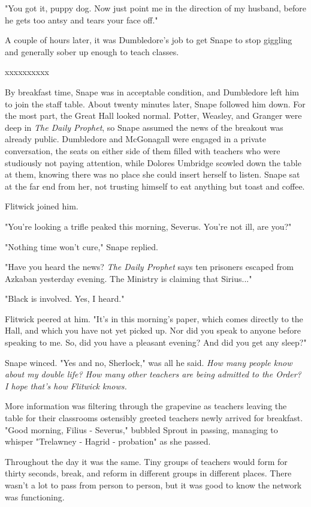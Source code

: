 \documentclass[a4paper,11pt]{article}
\begin{document}
"You got it, puppy dog. Now just point me in the direction of my husband, before he gets too antsy and tears your face off."

A couple of hours later, it was Dumbledore's job to get Snape to stop giggling and generally sober up enough to teach classes.

xxxxxxxxxx

By breakfast time, Snape was in acceptable condition, and Dumbledore left him to join the staff table. About twenty minutes later, Snape followed him down. For the most part, the Great Hall looked normal. Potter, Weasley, and Granger were deep in \emph{The Daily Prophet}, so Snape assumed the news of the breakout was already public. Dumbledore and McGonagall were engaged in a private conversation, the seats on either side of them filled with teachers who were studiously not paying attention, while Dolores Umbridge scowled down the table at them, knowing there was no place she could insert herself to listen. Snape sat at the far end from her, not trusting himself to eat anything but toast and coffee.

Flitwick joined him.

"You're looking a trifle peaked this morning, Severus. You're not ill, are you?"

"Nothing time won't cure," Snape replied.

"Have you heard the news? \emph{The Daily Prophet} says ten prisoners escaped from Azkaban yesterday evening. The Ministry is claiming that Sirius..."

"Black is involved. Yes, I heard."

Flitwick peered at him. "It's in this morning's paper, which comes directly to the Hall, and which you have not yet picked up. Nor did you speak to anyone before speaking to me. So, did you have a pleasant evening? And did you get any sleep?"

Snape winced. "Yes and no, Sherlock," was all he said. \emph{How many people know about my double life? How many other teachers are being admitted to the Order? I hope that's how Flitwick knows.}

More information was filtering through the grapevine as teachers leaving the table for their classrooms ostensibly greeted teachers newly arrived for breakfast. "Good morning, Filius - Severus," bubbled Sprout in passing, managing to whisper "Trelawney - Hagrid - probation" as she passed.

Throughout the day it was the same. Tiny groups of teachers would form for thirty seconds, break, and reform in different groups in different places. There wasn't a lot to pass from person to person, but it was good to know the network was functioning.
\end{document}
